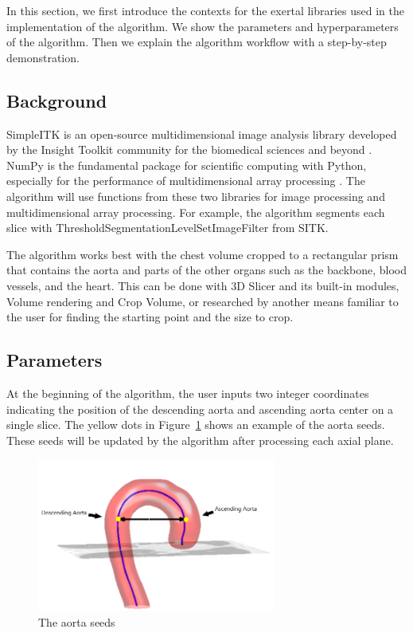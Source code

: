 In this section, we first introduce the contexts for the exertal libraries used in the implementation of the algorithm. We show the parameters and hyperparameters of the algorithm. Then we explain the algorithm workflow with a step-by-step demonstration.

\subsection{Background} \label{algo_bg}

SimpleITK is an open-source multidimensional image analysis library developed by the Insight Toolkit community for the biomedical sciences and beyond \cite{JSSv086i08}\cite{10.3389/fninf.2013.00045}. NumPy is the fundamental package for scientific computing with Python, especially for the performance of multidimensional array processing \cite{harris2020array}. The algorithm will use functions from these two libraries for image processing and multidimensional array processing. For example, the algorithm segments each slice with ThresholdSegmentationLevelSetImageFilter from SITK.

The algorithm works best with the chest volume cropped to a rectangular prism that contains the aorta and parts of the other organs such as the backbone, blood vessels, and the heart. This can be done with 3D Slicer and its built-in modules, Volume rendering and Crop Volume, or researched by another means familiar to the user for finding the starting point and the size to crop.

\subsection{Parameters}

At the beginning of the algorithm, the user inputs two integer coordinates indicating the position of the descending aorta and ascending aorta center on a single slice. The yellow dots in Figure~\ref{fig_aorta_seed} shows an example of the aorta seeds. These seeds will be updated by the algorithm after processing each axial plane.

\begin{figure}[ht]
    \centering
    \includegraphics[width=0.7\textwidth]{figures/Sample/Aorta_seeds.png}
    \caption[The Aorta Seeds]{The aorta seeds \citep{6346433}}
    \label{fig_aorta_seed}
\end{figure}

